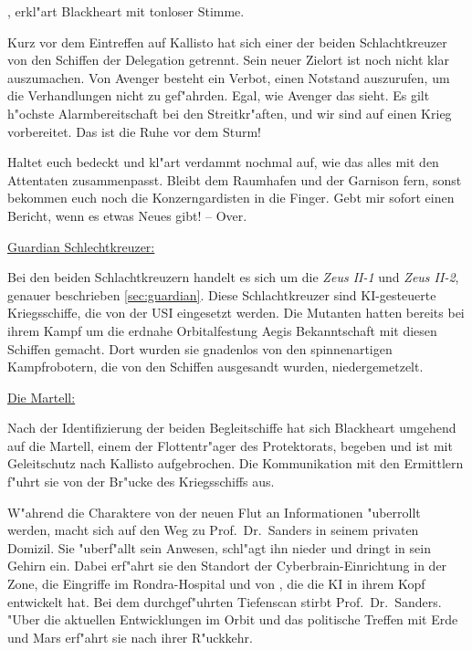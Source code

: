 , erkl"art Blackheart mit tonloser Stimme. 

\begin{speech}
	Kurz vor dem Eintreffen auf Kallisto hat sich einer der beiden Schlachtkreuzer von den Schiffen der Delegation getrennt. Sein neuer Zielort ist noch nicht klar auszumachen.  Von Avenger besteht ein Verbot, einen Notstand auszurufen, um die Verhandlungen nicht zu gef"ahrden. Egal, wie Avenger das sieht. Es gilt h"ochste Alarmbereitschaft bei den Streitkr"aften, und wir sind auf einen Krieg vorbereitet. Das ist die Ruhe vor dem Sturm!
	
	Haltet euch bedeckt und kl"art verdammt nochmal auf, wie das alles mit den Attentaten zusammenpasst. Bleibt dem Raumhafen und der Garnison fern, sonst bekommen euch noch die Konzerngardisten in die Finger. Gebt mir sofort einen Bericht, wenn es etwas Neues gibt! 
	-- Over.
\end{speech}

\begin{remarks}
	\underline{Guardian Schlechtkreuzer:}

	Bei den beiden Schlachtkreuzern handelt es sich um die \emph{Zeus II-1} und \emph{Zeus II-2}, genauer beschrieben \cref{sec:guardian}. Diese Schlachtkreuzer sind KI-gesteuerte Kriegsschiffe, die von der USI eingesetzt werden. Die Mutanten hatten bereits bei ihrem Kampf um die erdnahe Orbitalfestung Aegis Bekanntschaft mit diesen Schiffen gemacht. Dort wurden sie gnadenlos von den spinnenartigen Kampfrobotern, die von den Schiffen ausgesandt wurden, niedergemetzelt.

	\underline{Die Martell:}

	Nach der Identifizierung der beiden Begleitschiffe hat sich Blackheart umgehend auf die Martell, einem der Flottentr"ager des Protektorats, begeben und ist mit Geleitschutz nach Kallisto aufgebrochen. Die Kommunikation mit den Ermittlern f"uhrt sie von der Br"ucke des Kriegsschiffs aus.
\end{remarks}


W"ahrend die Charaktere von der neuen Flut an Informationen "uberrollt werden, macht sich \xl{} auf den Weg zu Prof.~Dr.~Sanders in seinem privaten Domizil. Sie "uberf"allt sein Anwesen, schl"agt ihn nieder und dringt in sein Gehirn ein. Dabei erf"ahrt sie den Standort der Cyberbrain-Einrichtung in der Zone, die Eingriffe im Rondra-Hospital und von \ml{}, die die KI in ihrem Kopf entwickelt hat. Bei dem durchgef"uhrten Tiefenscan stirbt Prof.~Dr.~Sanders. "Uber die aktuellen Entwicklungen im Orbit und das politische Treffen mit Erde und Mars erf"ahrt sie nach ihrer R"uckkehr.

